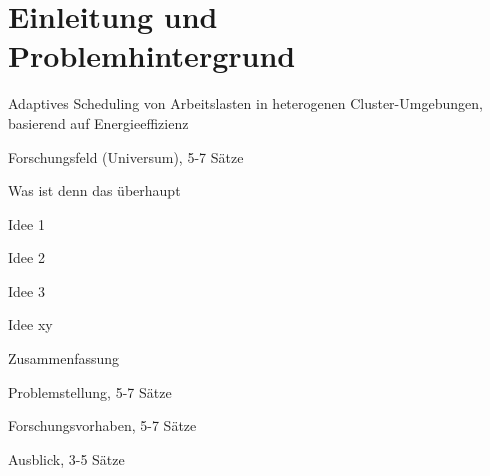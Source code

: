 \chapter{Einleitung und Problemhintergrund}

Adaptives Scheduling von Arbeitslasten in heterogenen Cluster-Umgebungen, basierend auf Energieeffizienz

Forschungsfeld (Universum), 5-7 Sätze

Was ist denn das überhaupt

Idee 1

Idee 2

Idee 3

Idee xy

Zusammenfassung

Problemstellung, 5-7 Sätze

Forschungsvorhaben, 5-7 Sätze

Ausblick, 3-5 Sätze
